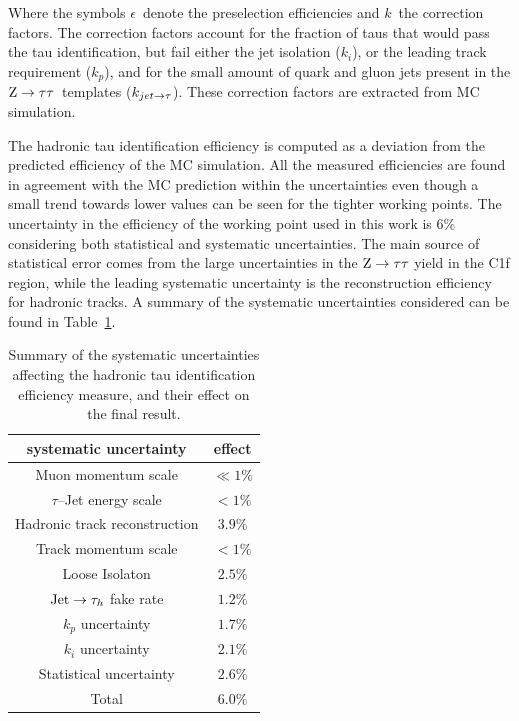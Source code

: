 Where the symbols $\epsilon$\ denote the preselection efficiencies and $k$\ the correction factors. The correction factors account for the fraction of taus that would pass the tau identification, but fail either the jet isolation ($k_i$), or the leading track requirement ($k_p$), and for the small amount of quark and gluon jets present in the $\mathrm{Z}\rightarrow\tau\tau$\ templates ($k_{jet \rightarrow \tau}$). These correction factors are extracted from MC simulation. 

The hadronic tau identification efficiency is computed as a deviation from the predicted efficiency of the MC simulation. All the measured efficiencies are found in agreement with the MC prediction within the uncertainties even though a small trend towards lower values can be seen for the tighter working points. The uncertainty in the efficiency of the working point used in this work is 6\% considering both statistical and systematic uncertainties. The main source of statistical error comes from the large uncertainties in the $\mathrm{Z}\rightarrow\tau\tau$ yield in the C1f region, while the leading systematic uncertainty is the reconstruction efficiency for hadronic tracks. A summary of the systematic uncertainties considered can be found in Table~\ref{tab:tau_eff_sys}.

\begin{table}
\begin{center}
\caption{Summary of the systematic uncertainties affecting the hadronic tau identification efficiency measure, and their effect on the final result.}
\label{tab:tau_eff_sys}
\begin{tabular}{|c|c|}
 \hline
 systematic uncertainty & effect \\
 \hline
Muon momentum scale & $\ll 1\%$ \\
$\tau$--Jet energy scale & $ < 1\%$ \\
Hadronic track reconstruction & $3.9\%$ \\
Track momentum scale & $< 1\%$ \\
Loose Isolaton & $2.5\%$ \\
$\mathrm{Jet}\rightarrow\tau_h$ fake rate & $1.2\%$ \\
$k_p$ uncertainty & $1.7\%$ \\
$k_i$ uncertainty & $2.1\%$ \\
Statistical uncertainty & $2.6\%$ \\
\hline
Total & $6.0\%$ \\
\hline
\end{tabular}
\end{center}
\end{table}


